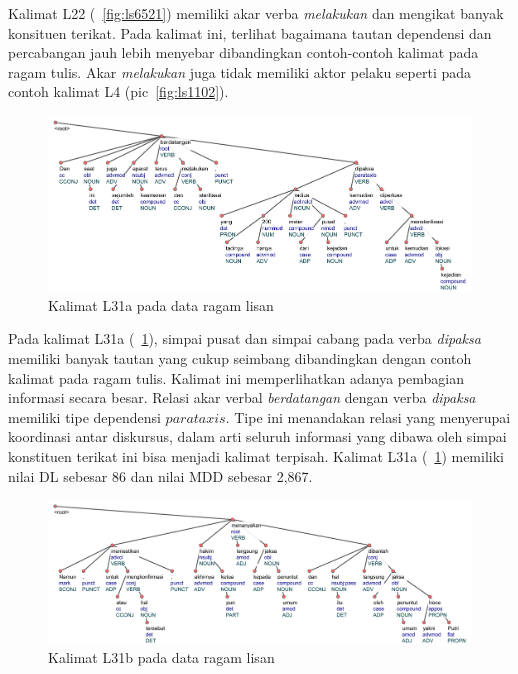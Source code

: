 Kalimat L22 (\pic~\ref{fig:ls6521}) memiliki akar verba \textit{melakukan} dan mengikat banyak konsituen terikat. Pada kalimat ini, terlihat bagaimana tautan dependensi dan percabangan jauh lebih menyebar dibandingkan contoh-contoh kalimat pada ragam tulis. Akar \textit{melakukan} juga tidak memiliki aktor pelaku seperti pada contoh kalimat L4 (pic~\ref{fig:ls1102}). 

\begin{figure}
	\centering \includegraphics[width=1
	\textwidth] {pics/ls1716.jpg} 
	\caption{Kalimat L31a pada data ragam lisan} 
	\label{fig:ls1716} 
\end{figure}

Pada kalimat L31a (\pic~\ref{fig:ls1716}), simpai pusat dan simpai cabang pada verba \textit{dipaksa} memiliki banyak tautan yang cukup seimbang dibandingkan dengan contoh kalimat pada ragam tulis. Kalimat ini memperlihatkan adanya pembagian informasi secara besar. Relasi akar verbal \textit{berdatangan} dengan verba \textit{dipaksa} memiliki tipe dependensi $parataxis$. Tipe ini menandakan relasi yang menyerupai koordinasi antar diskursus, dalam arti seluruh informasi yang dibawa oleh simpai konstituen terikat ini bisa menjadi kalimat terpisah. Kalimat L31a (\pic~\ref{fig:ls1716}) memiliki nilai DL sebesar 86 dan nilai MDD sebesar 2,867. 

\begin{figure}
	\centering \includegraphics[width=1
	\textwidth] {pics/ls16.jpg} 
	\caption{Kalimat L31b pada data ragam lisan}
	\label{fig:ls16} 
\end{figure}

